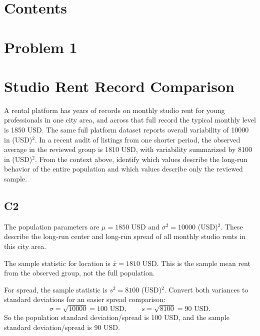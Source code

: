 


\section*{Contents}
\setcounter{tocdepth}{2}
\setcounter{secnumdepth}{1}
\tableofcontents


	\begin{ExamProblems}
		\item
		\section{Problem 1}
		\section{Studio Rent Record Comparison}
		A rental platform has years of records on monthly studio rent for young professionals in one city area, and across that full record the typical monthly level is 1850 USD.
		The same full platform dataset reports overall variability of 10000 in (USD)$^2$.
		In a recent audit of listings from one shorter period, the observed average in the reviewed group is 1810 USD, with variability summarized by 8100 in (USD)$^2$.
		From the context above, identify which values describe the long-run behavior of the entire population and which values describe only the reviewed sample.

\subsection*{C2}
		The population parameters are $\mu = 1850$ USD and $\sigma^2 = 10000$ (USD)$^2$.
		These describe the long-run center and long-run spread of all monthly studio rents in this city area.

		The sample statistic for location is $\bar{x} = 1810$ USD.
		This is the sample mean rent from the observed group, not the full population.

		For spread, the sample statistic is $s^2 = 8100$ (USD)$^2$.
		Convert both variances to standard deviations for an easier spread comparison:
		\[
		\sigma = \sqrt{10000} = 100 \text{ USD},
		\qquad
		s = \sqrt{8100} = 90 \text{ USD}.
		\]
		So the population standard deviation/spread is 100 USD, and the sample standard deviation/spread is 90 USD.


\end{ExamProblems}
